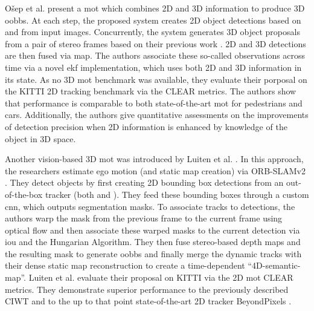 \documentclass[headsepline, hidelinks, footsepline, footinclude=false, oneside, fontsize=11pt, paper=a4, listof=totoc, bibliography=totoc]{scrbook}
\begin{document}
O\v{s}ep et al. \cite{osepCombinedImageWorldSpace2018} present a \gls{mot} which combines 2D and 3D information to produce 3D \glspl{oobb}. 
At each step, the proposed system creates 2D object detections based on \cite{geiger3DTrafficScene2014} and \cite{wangRegionletsGenericObject2015} from input images.
Concurrently, the system generates 3D object proposals from a pair of stereo frames based on their previous work \cite{osepMultiscaleObjectCandidates2016}. 2D and 3D detections are then fused via \gls{map}. The authors associate these so-called observations across time via a novel \gls{ekf} implementation, which uses both 2D and 3D information in its state. 
As no 3D \gls{mot} benchmark was available, they evaluate their porposal on the KITTI \cite{geigerVisionMeetsRobotics2013} 2D tracking benchmark via the CLEAR metrics.
The authors show that performance is comparable to both state-of-the-art \gls{mot} for pedestrians and cars. Additionally, the authors give quantitative assessments on the improvements of detection precision 
when 2D information is enhanced by knowledge of the object in 3D space.

Another vision-based 3D \gls{mot} was introduced by Luiten et al. \cite{luitenTrackReconstructReconstruct2020}. 
In this approach, the researchers estimate ego motion (and static map creation) via ORB-SLAMv2 \cite{mur-artalORBSLAM2OpenSourceSLAM2017}.
They detect objects by first creating 2D bounding box detections from an out-of-the-box tracker (both \cite{voigtlaenderMOTSMultiObjectTracking2019} and \cite{renAccurateSingleStage2017}). 
They feed these bounding boxes through a custom \gls{cnn}, which outputs segmentation masks.
To associate tracks to detections, the authors warp the mask from the previous frame to the current frame using optical flow and then associate these warped masks to the current detection via \gls{iou} and the Hungarian Algorithm.
They then fuse stereo-based depth maps and the resulting mask to generate \glspl{oobb} and finally merge the dynamic tracks with their dense static map reconstruction to create a time-dependent ``4D-semantic-map''.
Luiten et al. evaluate their proposal on KITTI \cite{geigerVisionMeetsRobotics2013} via the 2D \gls{mot} CLEAR metrics. They demonstrate superior performance to the previously described CIWT \cite{osepCombinedImageWorldSpace2018} and to the up to that point state-of-the-art 2D tracker BeyondPixels \cite{sharmaPixelsLeveragingGeometry2018}.
\end{document}
